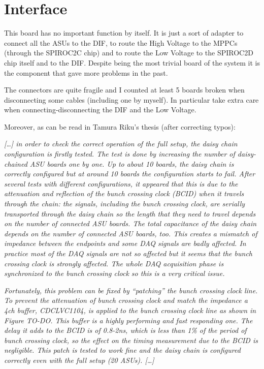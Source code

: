 \section{Interface}
This board has no important function by itself. It is just a sort of
adapter to connect all the ASUs to the DIF, to route the High Voltage
to the MPPCs (through the SPIROC2C chip) and to route the Low Voltage
to the SPIROC2D chip itself and to the DIF. Despite being the most
trivial board of the system it is the component that gave more problems
in the past.

The connectors are quite fragile and I counted at least 5 boards
broken when disconnecting some cables (including one by myself). In
particular take extra care when connecting-disconnecting the DIF and
the Low Voltage.

Moreover, as can be read in Tamura Riku's thesis (after correcting typos):

\textit{[\dots] in order to check the correct operation of
  the full setup, the daisy chain configuration is firstly tested. The
  test is done by increasing the number of daisy-chained ASU boards
  one by one. Up to about 10 boards, the daisy chain is correctly
  configured but at around 10 boards the configuration starts to
  fail. After several tests with different configurations, it appeared
  that this is due to the attenuation and reflection of the bunch
  crossing clock (BCID) when it travels through the chain: the
  signals, including the bunch crossing clock, are serially
  transported through the daisy chain so the length that they need to
  travel depends on the number of connected ASU boards. The total
  capacitance of the daisy chain depends on the number of connected
  ASU boards, too. This creates a mismatch of impedance between the
  endpoints and some DAQ signals are badly affected. In practice most
  of the DAQ signals are not so affected but it seems that the bunch
  crossing clock is strongly affected. The whole DAQ acquisition phase
  is synchronized to the bunch crossing clock so this is a very
  critical issue.}

\textit{Fortunately, this problem can be fixed by ``patching'' the
  bunch crossing clock line. To prevent the attenuation of bunch
  crossing clock and match the impedance a 4ch buffer,
  CDCLVC1104\cite{Texas-Instruments:CDCLVC11xx}, is applied to the
  bunch crossing clock line as shown in Figure TO-DO. This buffer is a
  highly performing and fast responding one. The delay it adds to the
  BCID is of 0.8-2ns, which is less than 1\% of the period of bunch
  crossing clock, so the effect on the timing measurement due to the
  BCID is negligible. This patch is tested to work fine and the daisy
  chain is configured correctly even with the full setup (20
  ASUs). [\dots]}

